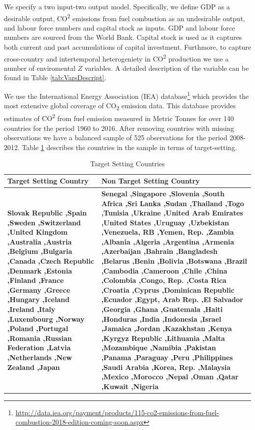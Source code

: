 \documentclass[
  12pt,
]{article}
\begin{document}
We specify a two input-two output model. Specifically, we define GDP as a desirable output, CO\textsuperscript{2} emissions from fuel combustion as an undesirable output, and labour force numbers and capital stock as inputs. GDP and labour force numbers are sourced from the World Bank. Capital stock is used as it captures both current and past accumulations of capital investment. Furthmore, to capture cross-country and intertemporal heterogeniety in CO\textsuperscript{2} production we use a number of enviromental \(Z\) variables. A detailed description of the variable can be found in Table \ref{tab:VarsDescript}.

We use the International Energy Association (IEA) database\footnote{\url{http://data.iea.org/payment/products/115-co2-emissions-from-fuel-combustion-2018-edition-coming-soon.aspx}} which provides the most extensive global coverage of CO\textsubscript{2} emission data. This database provides estimates of CO\textsuperscript{2} from fuel emission measured in Metric Tonnes for over 140 countries for the period 1960 to 2016. After removing countries with missing observations we have a balanced sample of 525 observations for the period 2008-2012. Table \ref{tab:targetSetters} describes the countries in the sample in terms of target-setting.

\begin{table}[H]

\caption{\label{tab:targetSetters}Target Setting Countries}
\centering
\fontsize{10}{12}\selectfont
\begin{tabular}[t]{>{\raggedright\arraybackslash}p{20em}>{\raggedright\arraybackslash}p{20em}}
\toprule
Target Setting Country & Non Target Setting Country\\
\midrule
\textbf{Slovak Republic ,Spain ,Sweden ,Switzerland ,United Kingdom ,Australia ,Austria ,Belgium ,Bulgaria ,Canada ,Czech Republic ,Denmark ,Estonia ,Finland ,France ,Germany ,Greece ,Hungary ,Iceland ,Ireland ,Italy ,Luxembourg ,Norway ,Poland ,Portugal ,Romania ,Russian Federation ,Latvia ,Netherlands ,New Zealand ,Japan} & \textbf{Senegal ,Singapore ,Slovenia ,South Africa ,Sri Lanka ,Sudan ,Thailand ,Togo ,Tunisia ,Ukraine ,United Arab Emirates ,United States ,Uruguay ,Uzbekistan ,Venezuela, RB ,Yemen, Rep. ,Zambia ,Albania ,Algeria ,Argentina ,Armenia ,Azerbaijan ,Bahrain ,Bangladesh ,Belarus ,Benin ,Bolivia ,Botswana ,Brazil ,Cambodia ,Cameroon ,Chile ,China ,Colombia ,Congo, Rep. ,Costa Rica ,Croatia ,Cyprus ,Dominican Republic ,Ecuador ,Egypt, Arab Rep. ,El Salvador ,Georgia ,Ghana ,Guatemala ,Haiti ,Honduras ,India ,Indonesia ,Israel ,Jamaica ,Jordan ,Kazakhstan ,Kenya ,Kyrgyz Republic ,Lithuania ,Malta ,Mozambique ,Namibia ,Pakistan ,Panama ,Paraguay ,Peru ,Philippines ,Saudi Arabia ,Korea, Rep. ,Malaysia ,Mexico ,Morocco ,Nepal ,Oman ,Qatar ,Kuwait ,Nigeria}\\
\bottomrule
\end{tabular}
\end{table}
\end{document}
